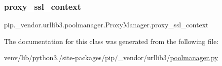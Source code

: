 \subsubsection{\texorpdfstring{proxy\+\_\+ssl\+\_\+context}{proxy\_ssl\_context}}
{\footnotesize\ttfamily pip.\+\_\+vendor.\+urllib3.\+poolmanager.\+Proxy\+Manager.\+proxy\+\_\+ssl\+\_\+context}



The documentation for this class was generated from the following file\+:\begin{DoxyCompactItemize}
\item 
venv/lib/python3./site-\/packages/pip/\+\_\+vendor/urllib3/\hyperlink{poolmanager_8py}{poolmanager.\+py}\end{DoxyCompactItemize}
